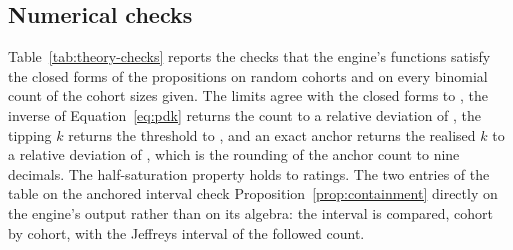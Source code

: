 \subsection{Numerical checks}

Table~\ref{tab:theory-checks} reports the checks that the engine's functions satisfy the closed forms of the propositions on  random cohorts and on every binomial count of the cohort sizes given. The limits agree with the closed forms to , the inverse of Equation~\eqref{eq:pdk} returns the count to a relative deviation of , the tipping $k$ returns the threshold to , and an exact anchor returns the realised $k$ to a relative deviation of , which is the rounding of the anchor count to nine decimals. The half-saturation property holds to  ratings. The two entries of the table on the anchored interval check Proposition~\ref{prop:containment} directly on the engine's output rather than on its algebra: the interval is compared, cohort by cohort, with the Jeffreys interval of the followed count.


